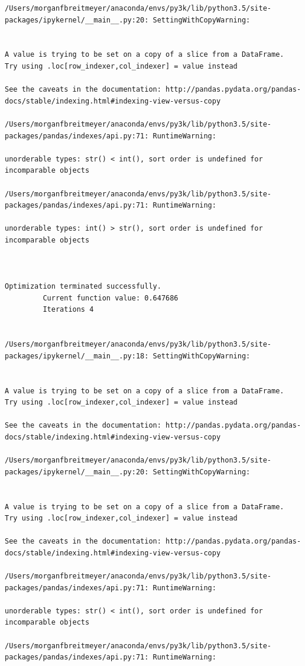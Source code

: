\begin{lstlisting}
/Users/morganfbreitmeyer/anaconda/envs/py3k/lib/python3.5/site-packages/ipykernel/__main__.py:20: SettingWithCopyWarning:


A value is trying to be set on a copy of a slice from a DataFrame.
Try using .loc[row_indexer,col_indexer] = value instead

See the caveats in the documentation: http://pandas.pydata.org/pandas-docs/stable/indexing.html#indexing-view-versus-copy

/Users/morganfbreitmeyer/anaconda/envs/py3k/lib/python3.5/site-packages/pandas/indexes/api.py:71: RuntimeWarning:

unorderable types: str() < int(), sort order is undefined for incomparable objects

/Users/morganfbreitmeyer/anaconda/envs/py3k/lib/python3.5/site-packages/pandas/indexes/api.py:71: RuntimeWarning:

unorderable types: int() > str(), sort order is undefined for incomparable objects



Optimization terminated successfully.
         Current function value: 0.647686
         Iterations 4


/Users/morganfbreitmeyer/anaconda/envs/py3k/lib/python3.5/site-packages/ipykernel/__main__.py:18: SettingWithCopyWarning:


A value is trying to be set on a copy of a slice from a DataFrame.
Try using .loc[row_indexer,col_indexer] = value instead

See the caveats in the documentation: http://pandas.pydata.org/pandas-docs/stable/indexing.html#indexing-view-versus-copy

/Users/morganfbreitmeyer/anaconda/envs/py3k/lib/python3.5/site-packages/ipykernel/__main__.py:20: SettingWithCopyWarning:


A value is trying to be set on a copy of a slice from a DataFrame.
Try using .loc[row_indexer,col_indexer] = value instead

See the caveats in the documentation: http://pandas.pydata.org/pandas-docs/stable/indexing.html#indexing-view-versus-copy

/Users/morganfbreitmeyer/anaconda/envs/py3k/lib/python3.5/site-packages/pandas/indexes/api.py:71: RuntimeWarning:

unorderable types: str() < int(), sort order is undefined for incomparable objects

/Users/morganfbreitmeyer/anaconda/envs/py3k/lib/python3.5/site-packages/pandas/indexes/api.py:71: RuntimeWarning:


\end{lstlisting}
